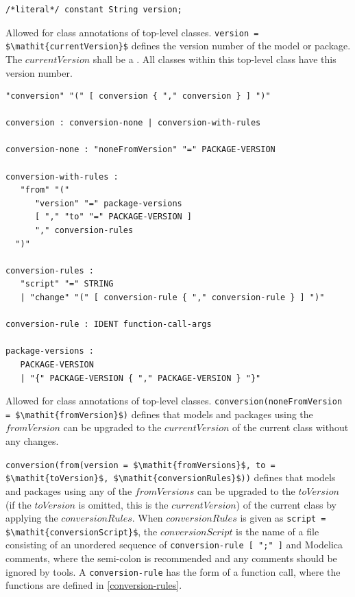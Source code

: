 \begin{annotationdefinition}[version]
\begin{synopsis}\begin{lstlisting}
/*literal*/ constant String version;
\end{lstlisting}\end{synopsis}
\begin{semantics}
Allowed for class annotations of top-level classes.
\lstinline!version = $\mathit{currentVersion}$! defines the version number of the model or package.
The $\mathit{currentVersion}$ shall be a .
All classes within this top-level class have this version number.
\end{semantics}
\end{annotationdefinition}

\begin{annotationdefinition}[conversion]
\begin{synopsis}[grammar]\begin{lstlisting}
"conversion" "(" [ conversion { "," conversion } ] ")"

conversion : conversion-none | conversion-with-rules

conversion-none : "noneFromVersion" "=" PACKAGE-VERSION

conversion-with-rules :
   "from" "("
      "version" "=" package-versions
      [ "," "to" "=" PACKAGE-VERSION ]
      "," conversion-rules
  ")"

conversion-rules :
   "script" "=" STRING
   | "change" "(" [ conversion-rule { "," conversion-rule } ] ")"

conversion-rule : IDENT function-call-args

package-versions :
   PACKAGE-VERSION
   | "{" PACKAGE-VERSION { "," PACKAGE-VERSION } "}"
\end{lstlisting}\end{synopsis}
\begin{semantics}
Allowed for class annotations of top-level classes.
\lstinline!conversion(noneFromVersion = $\mathit{fromVersion}$)! defines that models and packages using the $\mathit{fromVersion}$ can be upgraded to the $\mathit{currentVersion}$ of the current class without any changes.

\lstinline!conversion(from(version = $\mathit{fromVersions}$, to = $\mathit{toVersion}$, $\mathit{conversionRules}$))! defines that models and packages using any of the $\mathit{fromVersions}$ can be upgraded to the $\mathit{toVersion}$ (if the $\mathit{toVersion}$ is omitted, this is the $\mathit{currentVersion}$) of the current class by applying the $\mathit{conversionRules}$.
When $\mathit{conversionRules}$ is given as \lstinline!script = $\mathit{conversionScript}$!, the $\mathit{conversionScript}$ is the name of a file consisting of an unordered sequence of \lstinline[language=grammar]!conversion-rule [ ";" ]! and Modelica comments, where the semi-colon is recommended and any comments should be ignored by tools.
A \lstinline[language=grammar]!conversion-rule! has the form of a function call, where the functions are defined in \cref{conversion-rules}.


\end{semantics}
\end{annotationdefinition}
